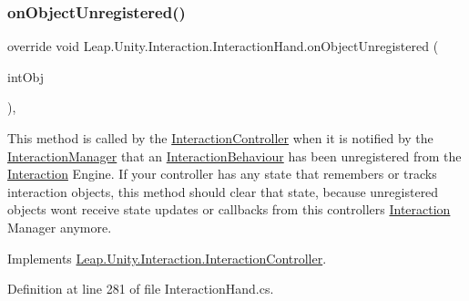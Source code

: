 \subsubsection{\texorpdfstring{onObjectUnregistered()}{onObjectUnregistered()}}
{\footnotesize\ttfamily override void Leap.\+Unity.\+Interaction.\+Interaction\+Hand.\+on\+Object\+Unregistered (\begin{DoxyParamCaption}\item[{\mbox{\hyperlink{interface_leap_1_1_unity_1_1_interaction_1_1_i_interaction_behaviour}{I\+Interaction\+Behaviour}}}]{int\+Obj }\end{DoxyParamCaption})\hspace{0.3cm}{\ttfamily [protected]}, {\ttfamily [virtual]}}



This method is called by the \mbox{\hyperlink{class_leap_1_1_unity_1_1_interaction_1_1_interaction_controller}{Interaction\+Controller}} when it is notified by the \mbox{\hyperlink{class_leap_1_1_unity_1_1_interaction_1_1_interaction_manager}{Interaction\+Manager}} that an \mbox{\hyperlink{class_leap_1_1_unity_1_1_interaction_1_1_interaction_behaviour}{Interaction\+Behaviour}} has been unregistered from the \mbox{\hyperlink{namespace_leap_1_1_unity_1_1_interaction}{Interaction}} Engine. If your controller has any state that remembers or tracks interaction objects, this method should clear that state, because unregistered objects won\textquotesingle{}t receive state updates or callbacks from this controller\textquotesingle{}s \mbox{\hyperlink{namespace_leap_1_1_unity_1_1_interaction}{Interaction}} Manager anymore. 



Implements \mbox{\hyperlink{class_leap_1_1_unity_1_1_interaction_1_1_interaction_controller_a0798edd8ad92d6b7f6229e3d9ac26d07}{Leap.\+Unity.\+Interaction.\+Interaction\+Controller}}.



Definition at line 281 of file Interaction\+Hand.\+cs.

\mbox{\label{class_leap_1_1_unity_1_1_interaction_1_1_interaction_hand_abeba3757a254063269d0a417ac0611d0}} 
